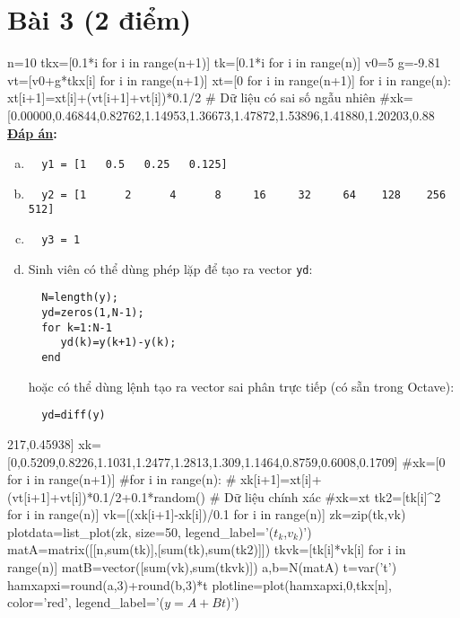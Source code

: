 \documentclass[11pt]{article}
\newcommand{\Solution}{
\medskip
{\bf \underline{Đáp án}:}
}
\begin{document}
\section{Bài 3 (2 điểm)}


\begin{sagesilent}
n=10
tkx=[0.1*i for i in range(n+1)]
tk=[0.1*i for i in range(n)]
v0=5
g=-9.81
vt=[v0+g*tkx[i] for i in range(n+1)]
xt=[0 for i in range(n+1)]
for i in range(n):
 xt[i+1]=xt[i]+(vt[i+1]+vt[i])*0.1/2
# Dữ liệu có sai số ngẫu nhiên
#xk=[0.00000,0.46844,0.82762,1.14953,1.36673,1.47872,1.53896,1.41880,1.20203,0.88\Solution 

\begin{enumerate}[a).]
 \item 
  \begin{verbatim}
  y1 = [1   0.5   0.25   0.125]
  \end{verbatim}
 \item 
  \begin{verbatim}
  y2 = [1      2      4      8     16     32     64    128    256    512]
  \end{verbatim}
 \item 
  \begin{verbatim}
  y3 = 1
  \end{verbatim}
 \item Sinh viên có thể dùng phép lặp để tạo ra vector \texttt{yd}:
  \begin{verbatim}
  N=length(y);
  yd=zeros(1,N-1);
  for k=1:N-1
     yd(k)=y(k+1)-y(k);
  end
  \end{verbatim}
  hoặc có thể dùng lệnh tạo ra vector sai phân trực tiếp (có sẵn trong Octave):
  \begin{verbatim}
  yd=diff(y)
  \end{verbatim}
\end{enumerate}
217,0.45938]
xk=[0,0.5209,0.8226,1.1031,1.2477,1.2813,1.309,1.1464,0.8759,0.6008,0.1709]
#xk=[0 for i in range(n+1)]
#for i in range(n):
# xk[i+1]=xt[i]+(vt[i+1]+vt[i])*0.1/2+0.1*random()
# Dữ liệu chính xác
#xk=xt
tk2=[tk[i]^2 for i in range(n)]
vk=[(xk[i+1]-xk[i])/0.1 for i in range(n)]
zk=zip(tk,vk)
plotdata=list_plot(zk, size=50, legend_label='($t_k$,$v_k$)')
matA=matrix([[n,sum(tk)],[sum(tk),sum(tk2)]])
tkvk=[tk[i]*vk[i] for i in range(n)]
matB=vector([sum(vk),sum(tkvk)])
a,b=N(matA\matB)
t=var('t')
hamxapxi=round(a,3)+round(b,3)*t
plotline=plot(hamxapxi,0,tkx[n], color='red', legend_label='($y=A+Bt$)')


\end{sagesilent}
\end{document}
